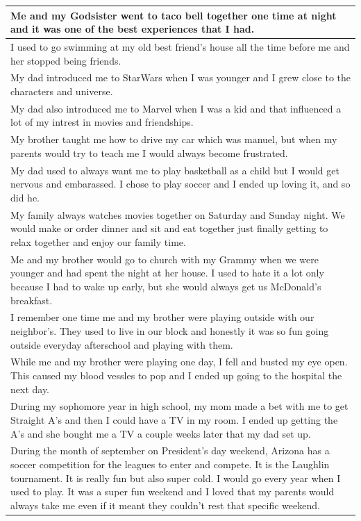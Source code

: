 \documentclass[
  .7em,
  letterpaper,
  DIV=11,
  numbers=noendperiod]{scrartcl}
\begin{document}
\begin{table}
\begin{tabular}{l}
\hline
Me and my Godsister went to taco bell together one time at night and it was one of the best experiences that I had.\\
\hline
I used to go swimming at my old best friend's house all the time before me and her stopped being friends.\\
\hline
My dad introduced me to StarWars when I was younger and I grew close to the characters and universe.\\
\hline
My dad also introduced me to Marvel when I was a kid and that influenced a lot of my intrest in movies and friendships.\\
\hline
My brother taught me how to drive my car which was manuel, but when my parents would try to teach me I would always become frustrated.\\
\hline
My dad used to always want me to play basketball as a child but I would get nervous and embarassed. I chose to play soccer and I ended up loving it, and so did he.\\
\hline
My family always watches movies together on Saturday and Sunday night. We would make or order dinner and sit and eat together just finally getting to relax together and enjoy our family time.\\
\hline
Me and my brother would go to church with my Grammy when we were younger and had spent the night at her house. I used to hate it a lot only because I had to wake up early, but she would always get us McDonald's breakfast.\\
\hline
I remember one time me and my brother were playing outside with our neighbor's. They used to live in our block and honestly it was so fun going outside everyday afterschool and playing with them.\\
\hline
While me and my brother were playing one day, I fell and busted my eye open. This caused my blood vessles to pop and I ended up going to the hospital the next day.\\
\hline
During my sophomore year in high school, my mom made a bet with me to get Straight A's and then I could have a TV in my room. I ended up getting the A's and she bought me a TV a couple weeks later that my dad set up.\\
\hline
During the month of september on President's day weekend, Arizona has a soccer competition for the leagues to enter and compete. It is the Laughlin tournament. It is really fun but also super cold. I would go every year when I used to play. It was a super fun weekend and I loved that my parents would always take me even if it meant they couldn't rest that specific weekend.\\

\end{tabular}
\end{table}
\end{document}
